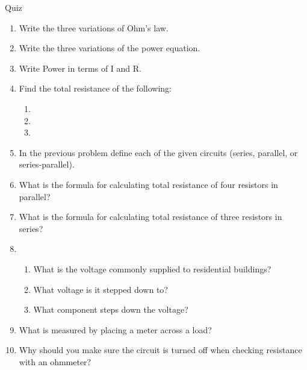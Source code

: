 \documentclass[12pt]{article}
\begin{document}
\begin{flushleft}
Quiz
\begin{enumerate}
\item Write the three variations of Ohm's law.
\medskip
\item Write the three variations of the power equation.
\medskip
\item Write Power in terms of I and R.
\medskip
\item Find the total resistance of the following:
\begin{enumerate}
\item \begin{minipage}[t]{\linewidth}
\end{minipage}
\medskip

\item \begin{minipage}[t]{\linewidth}
\end{minipage}
\medskip

\item \begin{minipage}[t]{\linewidth}
\end{minipage}
\medskip
\end{enumerate}
\item In the previous problem define each of the given circuits (series, parallel, or series-parallel).
\medskip
\item What is the formula for calculating total resistance of four resistors in parallel?
\medskip
\item What is the formula for calculating total resistance of three resistors in series?
\medskip
\item \begin{enumerate}
\item What is the voltage commonly supplied to residential buildings?
\item What voltage is it stepped down to?
\item What component steps down the voltage?
\end{enumerate}
\medskip
\item What is measured by placing a meter across a load?
\medskip
\item Why should you make sure the circuit is turned off when checking resistance with an ohmmeter?
\medskip
\end{enumerate}
\end{flushleft}
\end{document}
